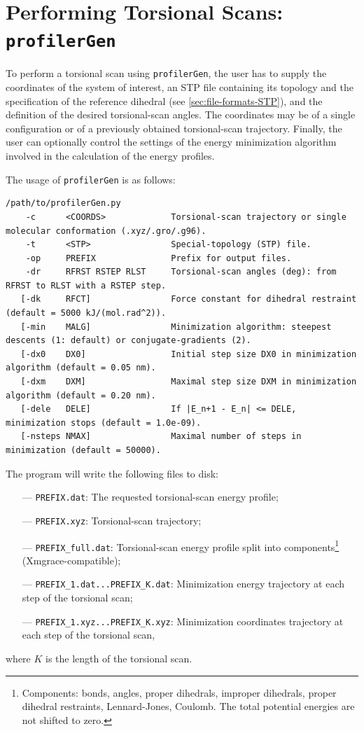 \documentclass[10pt,a4paper]{report}
\numberwithin{equation}{section}
\newcommand{\profilergen}[0]{\texttt{profilerGen}}
\begin{document}
\section{Performing Torsional Scans: \profilergen{}}
\label{sec:program-gen}

To perform a torsional scan using \profilergen{}, the user has to
supply the coordinates of the system of interest, an STP file
containing its topology and the specification of the reference
dihedral (see \autoref{sec:file-formats-STP}), and the definition of
the desired torsional-scan angles. The coordinates may be of a single
configuration or of a previously obtained torsional-scan trajectory.  Finally, the user
can optionally control the settings of the energy minimization
algorithm involved in the calculation of the energy profiles.

The usage of \profilergen{} is as follows:

\begin{lstlisting}
/path/to/profilerGen.py 
    -c      <COORDS>             Torsional-scan trajectory or single molecular conformation (.xyz/.gro/.g96).
    -t      <STP>                Special-topology (STP) file.
    -op     PREFIX               Prefix for output files.
    -dr     RFRST RSTEP RLST     Torsional-scan angles (deg): from RFRST to RLST with a RSTEP step.
   [-dk     RFCT]                Force constant for dihedral restraint (default = 5000 kJ/(mol.rad^2)).
   [-min    MALG]                Minimization algorithm: steepest descents (1: default) or conjugate-gradients (2).
   [-dx0    DX0]                 Initial step size DX0 in minimization algorithm (default = 0.05 nm).
   [-dxm    DXM]                 Maximal step size DXM in minimization algorithm (default = 0.20 nm).
   [-dele   DELE]                If |E_n+1 - E_n| <= DELE, minimization stops (default = 1.0e-09).
   [-nsteps NMAX]                Maximal number of steps in minimization (default = 50000).
\end{lstlisting}\vspace{-2ex}
The program will write the following files to disk:
\begin{itemize}
\item[---] \texttt{PREFIX.dat}: The requested torsional-scan energy profile;
\item[---] \texttt{PREFIX.xyz}: Torsional-scan trajectory;
\item[---] \texttt{PREFIX\_full.dat}: Torsional-scan energy profile split into components\footnote{Components: bonds, angles, proper dihedrals, improper dihedrals, proper dihedral restraints, Lennard-Jones, Coulomb. The total potential energies are not shifted to zero.} (Xmgrace-compatible);
\item[---] \texttt{PREFIX\_1.dat...PREFIX\_K.dat}: Minimization energy trajectory at each step of the torsional scan;
\item[---] \texttt{PREFIX\_1.xyz...PREFIX\_K.xyz}: Minimization coordinates trajectory at each step of the torsional scan,
\end{itemize}
where $K$ is the length of the torsional scan.
\end{document}
